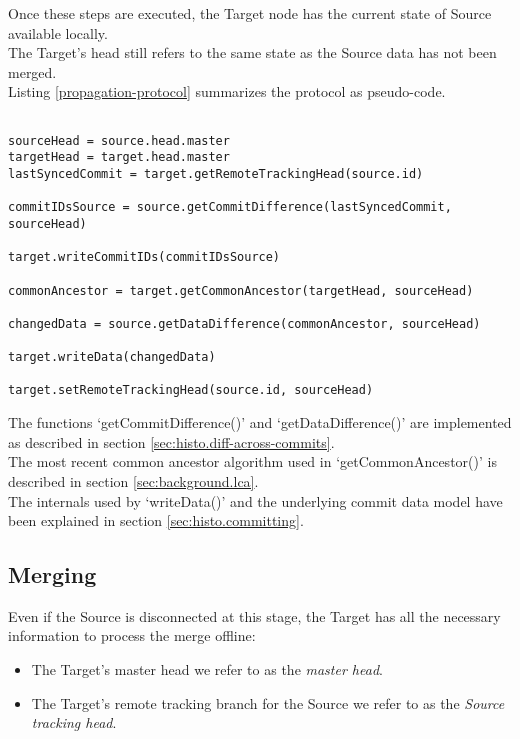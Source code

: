 Once these steps are executed, the Target node has the current state of Source available locally.\\
The Target's head still refers to the same state as the Source data has not been merged.\\

Listing \ref{propagation-protocol} summarizes the protocol as pseudo-code.\\

\begin{lstlisting}[caption=Detecting updates across nodes and propagating the changes., label=propagation-protocol]

sourceHead = source.head.master
targetHead = target.head.master
lastSyncedCommit = target.getRemoteTrackingHead(source.id)

commitIDsSource = source.getCommitDifference(lastSyncedCommit, sourceHead)

target.writeCommitIDs(commitIDsSource)

commonAncestor = target.getCommonAncestor(targetHead, sourceHead)

changedData = source.getDataDifference(commonAncestor, sourceHead)

target.writeData(changedData)

target.setRemoteTrackingHead(source.id, sourceHead)

\end{lstlisting}

The functions `getCommitDifference()' and `getDataDifference()' are implemented as described in section \ref{sec:histo.diff-across-commits}.\\
The most recent common ancestor algorithm used in `getCommonAncestor()' is described in section \ref{sec:background.lca}.\\
The internals used by `writeData()' and the underlying commit data model have been explained in section \ref{sec:histo.committing}.

\subsection{Merging}
\label{sec:histo.protocol.merging}
Even if the Source is disconnected at this stage, the Target has all the necessary information to process the merge offline:\\

\begin{itemize}
\item The Target's master head we refer to as the \emph{master head}.\\
\item The Target's remote tracking branch for the Source we refer to as the \emph{Source tracking head}.
\end{itemize}


